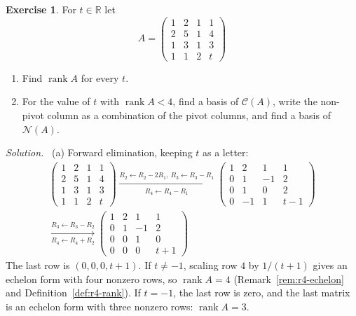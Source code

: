 \documentclass[12pt]{article}
\newcommand{\R}{\mathbb R}
\DeclareMathOperator{\rank}{rank}
\theoremstyle{definition}
\newtheorem{exercise}{Exercise}
\newenvironment{solution}{\par\noindent\textit{Solution.}\ }{\par\smallskip}
\begin{document}
\begin{exercise}\label{r4-dr-rank-parameter}
For \(t\in\R\) let
\[
A=\begin{pmatrix}1&2&1&1\\2&5&1&4\\1&3&1&3\\1&1&2&t\end{pmatrix}
\]
\begin{enumerate}
\item Find \(\rank A\) for every \(t\).
\item For the value of \(t\) with \(\rank A<4\), find a basis of \(\mathcal C(A)\), write the non-pivot column as a
combination of the pivot columns, and find a basis of \(\mathcal N(A)\).
\end{enumerate}
\end{exercise}
\begin{solution}
(a) Forward elimination, keeping \(t\) as a letter:
\[
\begin{gathered}
\begin{pmatrix}1&2&1&1\\2&5&1&4\\1&3&1&3\\1&1&2&t\end{pmatrix}
\xrightarrow[R_4\leftarrow R_4-R_1]{R_2\leftarrow R_2-2R_1,\ R_3\leftarrow R_3-R_1}
\begin{pmatrix}1&2&1&1\\0&1&-1&2\\0&1&0&2\\0&-1&1&t-1\end{pmatrix}
\\
\xrightarrow[R_4\leftarrow R_4+R_2]{R_3\leftarrow R_3-R_2}
\begin{pmatrix}1&2&1&1\\0&1&-1&2\\0&0&1&0\\0&0&0&t+1\end{pmatrix}
\end{gathered}
\]
The last row is \((0,0,0,t+1)\). If \(t\ne-1\), scaling row \(4\) by \(1/(t+1)\) gives an echelon form with four
nonzero rows, so \(\rank A=4\) (Remark~\ref{rem:r4-echelon} and Definition~\ref{def:r4-rank}). If \(t=-1\), the last row
is zero, and the last matrix is an echelon form with three nonzero rows: \(\rank A=3\).


\end{solution}
\end{document}
